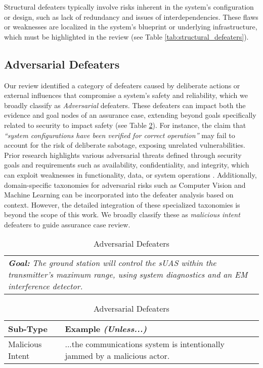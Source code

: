 Structural defeaters typically involve risks inherent in the system’s configuration or design, such as lack of redundancy and issues of interdependencies. These flaws or weaknesses are localized in the system’s blueprint or underlying infrastructure, which must be highlighted in the review (see Table \ref{tab:structural_defeaters}).



\subsection{Adversarial Defeaters}

Our review identified a category of defeaters caused by deliberate actions or external influences that compromise a system’s safety and reliability, which we broadly classify as \emph{Adversarial} defeaters. These defeaters can impact both the evidence and goal nodes of an assurance case, extending beyond goals specifically related to security to impact safety (see Table \ref{tab:adversarial_defeaters}). For instance, the claim that \textit{``system configurations have been verified for correct operation''} may fail to account for the risk of deliberate sabotage, exposing unrelated vulnerabilities. Prior research highlights various adversarial threats defined through security goals and requirements such as availability, confidentiality, and integrity, which can exploit weaknesses in functionality, data, or system operations \cite{HaleyLMN08}. Additionally, domain-specific taxonomies for adversarial risks such as Computer Vision \cite{long2022survey} and Machine Learning \cite{tabassi2019taxonomy} 
can be incorporated into the defeater analysis based on context. However, the detailed integration of these specialized taxonomies is beyond the scope of this work. We broadly classify these as \emph{malicious intent} defeaters to guide assurance case review.

\begin{table}[t]
\centering
\caption{Adversarial Defeaters}
\begin{tabularx}{\linewidth}{ @{} X }
\toprule
 \textit{\textbf{Goal:}} \textit{The ground station will control the sUAS within the transmitter's maximum range, using system diagnostics and an EM interference detector.} \\
\end{tabularx}

\begin{tabularx}{\linewidth}{@{} l X }
\toprule
\textbf{Sub-Type} & \textbf{Example \textit{(Unless...)}} \\
\midrule
Malicious Intent & ...the communications system is intentionally jammed by a malicious actor. \\
\bottomrule
\end{tabularx}
\label{tab:adversarial_defeaters}
\end{table}


